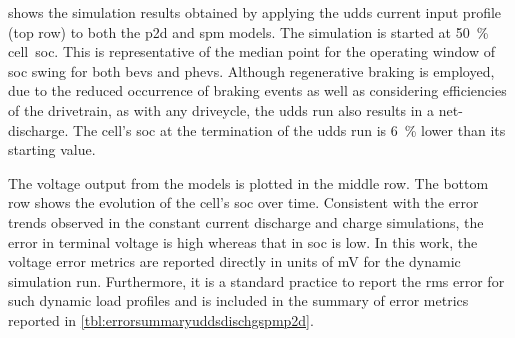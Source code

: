   shows   the  simulation  results   obtained  by
applying  the   \gls{udds}  current  input   profile  (top  row)  to   both  the
\gls{p2d} and \gls{spm}  models. The simulation is  started at \SI{50}{\percent}
cell~\gls{soc}. This  is representative  of the median  point for  the operating
window  of  \gls{soc} swing  for  both  \glspl{bev} and  \glspl{phev}.  Although
regenerative  braking is  employed, due  to  the reduced  occurrence of  braking
events  as well  as  considering efficiencies  of the  drivetrain,  as with  any
driveycle,  the \gls{udds}  run  also  results in  a  net-discharge. The  cell's
\gls{soc} at  the termination of  the \gls{udds} run  is \approx\SI{6}{\percent}
lower than its starting value.


The voltage output from the models is  plotted in the middle row. The bottom row
shows  the  evolution  of  the  cell's  \gls{soc}  over  time.  Consistent  with
the  error  trends  observed  in  the  constant  current  discharge  and  charge
simulations, the error in terminal voltage  is high whereas that in \gls{soc} is
low.  In  this  work,  the  voltage  error  metrics  are  reported  directly  in
units  of  \si{\milli\volt} for  the  dynamic  simulation run.  Furthermore,  it
is  a  standard  practice  to  report  the  \gls{rms}  error  for  such  dynamic
load  profiles and  is included  in  the summary  of error  metrics reported  in
\cref{tbl:errorsummaryuddsdischgspmp2d}.




